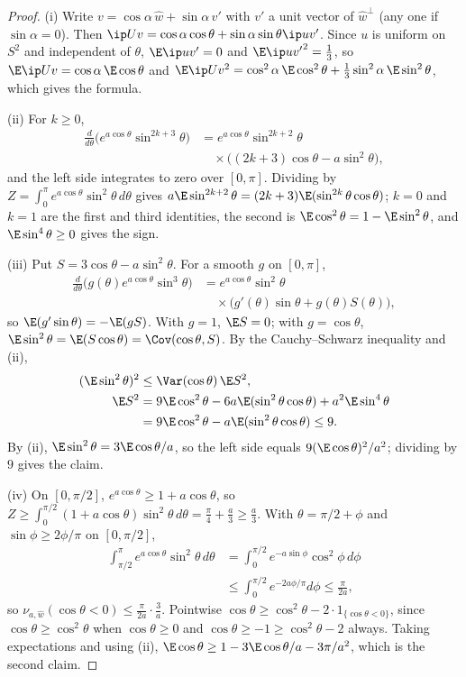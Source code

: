 \begin{proof}
(i) Write $v=\cos\alpha\,\hat w+\sin\alpha\,v'$ with $v'$ a unit vector of
$\hat w^\perp$ (any one if $\sin\alpha=0$). Then $\ip Uv=\cos\alpha\cos
\theta+\sin\alpha\sin\theta\ip u{v'}$. Since $u$ is uniform on $S^2$ and
independent of $\theta$, $\E\ip u{v'}=0$ and $\E\ip u{v'}^2=\frac13$, so
$\E\ip Uv=\cos\alpha\,\E\cos\theta$ and $\E\ip Uv^2=\cos^2\alpha\,\E\cos^2
\theta+\frac13\sin^2\alpha\,\E\sin^2\theta$, which gives the formula.

(ii) For $k\ge0$,
\[
\begin{split}
\frac d{d\theta}\bigl(e^{a\cos\theta}\sin^{2k+3}\theta\bigr)&=e^{a\cos
\theta}\sin^{2k+2}\theta\\
&\quad\times\bigl((2k+3)\cos\theta-a\sin^2\theta\bigr),
\end{split}
\]
and the left side integrates to zero over $[0,\pi]$. Dividing by
$Z=\int_0^\pi e^{a\cos\theta}\sin^2\theta\,d\theta$ gives $a\E\sin^{2k+2}
\theta=(2k+3)\E(\sin^{2k}\theta\cos\theta)$; $k=0$ and $k=1$ are the first
and third identities, the second is $\E\cos^2\theta=1-\E\sin^2\theta$, and
$\E\sin^4\theta\ge0$ gives the sign.

(iii) Put $S=3\cos\theta-a\sin^2\theta$. For a smooth $g$ on $[0,\pi]$,
\[
\begin{split}
\frac d{d\theta}\bigl(g(\theta)e^{a\cos\theta}\sin^3\theta\bigr)&=e^{a\cos
\theta}\sin^2\theta\\
&\quad\times\bigl(g'(\theta)\sin\theta+g(\theta)S(\theta)\bigr),
\end{split}
\]
so $\E(g'\sin\theta)=-\E(gS)$. With $g=1$, $\E S=0$; with $g=\cos\theta$,
$\E\sin^2\theta=\E(S\cos\theta)=\Cov(\cos\theta,S)$. By the Cauchy--Schwarz
inequality and (ii),
\[
\begin{split}
(\E\sin^2\theta)^2&\le\Var(\cos\theta)\,\E S^2,\\
\E S^2&=9\E\cos^2\theta-6a\E(\sin^2\theta\cos\theta)+a^2\E\sin^4\theta\\
&=9\E\cos^2\theta-a\E(\sin^2\theta\cos\theta)\le9 .
\end{split}
\]
By (ii), $\E\sin^2\theta=3\E\cos\theta/a$, so the left side equals
$9(\E\cos\theta)^2/a^2$; dividing by $9$ gives the claim.

(iv) On $[0,\pi/2]$, $e^{a\cos\theta}\ge1+a\cos\theta$, so $Z\ge\int_0^{\pi
/2}(1+a\cos\theta)\sin^2\theta\,d\theta=\frac\pi4+\frac a3\ge\frac a3$. With
$\theta=\pi/2+\phi$ and $\sin\phi\ge2\phi/\pi$ on $[0,\pi/2]$,
\[
\begin{split}
\int_{\pi/2}^\pi e^{a\cos\theta}\sin^2\theta\,d\theta&=\int_0^{\pi/2}e^{-a
\sin\phi}\cos^2\phi\,d\phi\\
&\le\int_0^{\pi/2}e^{-2a\phi/\pi}d\phi\le\frac\pi{2a},
\end{split}
\]
so $\nu_{a,\hat w}(\cos\theta<0)\le\frac\pi{2a}\cdot\frac3a$. Pointwise
$\cos\theta\ge\cos^2\theta-2\cdot1_{\{\cos\theta<0\}}$, since $\cos\theta
\ge\cos^2\theta$ when $\cos\theta\ge0$ and $\cos\theta\ge-1\ge\cos^2\theta
-2$ always. Taking expectations and using (ii), $\E\cos\theta\ge1-3\E\cos
\theta/a-3\pi/a^2$, which is the second claim.


\end{proof}
